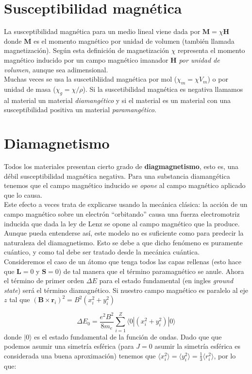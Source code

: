 \documentclass[12pt,a4paper]{book}
\numberwithin{equation}{section}
\numberwithin{figure}{section}
\newcommand{\rn}{\mathbf{r}}
\newcommand{\Bn}{\mathbf{B}}
\newcommand{\Hn}{\mathbf{H}}
\newcommand{\Ln}{\mathbf{L}}
\newcommand{\Mn}{\mathbf{M}}
\newcommand{\Sn}{\mathbf{S}}
\begin{document}
\section{Susceptibilidad magnética}

La susceptibilidad magnética para un medio lineal viene dada por $\Mn = \chi \Hn$ donde $\Mn$ es el momento magnético por unidad de volumen (también llamada magnetización). Según esta definición de magnetización $\chi$ representa el momento magnético inducido por un campo magnético imanador $\Hn$ \textit{por unidad de volumen}, aunque sea adimensional.   \\

Muchas veces se usa la suscetibliidad magnética por mol ($\chi_m = \chi V_m$) o  por unidad de masa ($\chi_g = \chi / \rho$). Si la suscetibilidad magnética es negativa llamamos al material un material \textit{diamangético} y si el material es un material con una susceptibilidad positiva un material \textit{paramangético}.

\section{Diamagnetismo}

Todos los materiales presentan cierto grado de \textbf{diagmagnetismo}, esto es, una débil susceptibilidad magnética negativa. Para una substancia diamangética tenemos que el campo magnético inducido se \textit{opone} al campo magnético aplicado que lo causa. \\

Este efecto a veces trata de explicarse usando la mecánica clásica: la acción de un campo magnético sobre un electrón ``orbitando'' causa una fuerza electromotriz inducida que dada la ley de Lenz se opone al campo magnético que la produce. Aunque pueda entenderse así, este modelo no es suficiente como para predecir la naturaleza del diamagnetismo. Esto se debe a que dicho fenómeno es puramente cuántico, y como tal debe ser tratado desde la mecánica cuántica. \\

Consideremos el caso de un átomo que tenga todos las capas rellenas (esto hace que $\Ln = 0$ y $\Sn = 0$) de tal manera que el término paramagnético se anule. Ahora el término de primer orden $\Delta E$ para el estado fundamental (en ingles \textit{ground state}) será el término diamagnético. Si nuestro campo magnético es paralelo al eje $z$ tal que $(\Bn \times \rn_i)^2 = B^2 (x_i^2+y_i^2)$

\begin{equation}
\Delta E_0 = \frac{e^2 B^2}{8 m_e} \sum_{i=1}^Z \langle 0 | (x_i^2+y_i^2) | 0 \rangle 
\end{equation}
donde $|0\rangle$ es el estado fundamental de la función de ondas. Dado que  que podemos asumir una simetría esférica (para $J=0$ asumir la simetría esférica es considerada una buena aproximación) tenemos que $\langle x_i^2 \rangle = \langle y_i^2 \rangle = \frac{1}{3} \langle r_i^2 \rangle$, por lo que:
\end{document}

